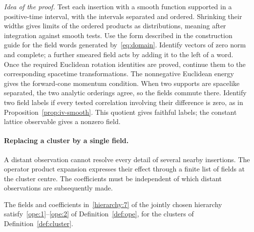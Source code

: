 \emph{Idea of the proof.}
Test each insertion with a smooth function supported in a positive-time interval, with the intervals separated and ordered. Shrinking their widths gives limits of the ordered products as distributions, meaning after integration against smooth tests.
Use the form described in the construction guide for the field words generated by~\eqref{eq:domain}. Identify vectors of zero norm and complete; a further smeared field acts by adding it to the left of a word.
Once the required Euclidean rotation identities are proved, continue them to the corresponding spacetime transformations. The nonnegative Euclidean energy gives the forward-cone momentum condition. When two supports are spacelike separated, the two analytic orderings agree, so the fields commute there.
Identify two field labels if every tested correlation involving their difference is zero, as in Proposition~\ref{prop:iv-smooth}. This quotient gives faithful labels; the constant lattice observable gives a nonzero field.


\paragraph{Replacing a cluster by a single field.}
A distant observation cannot resolve every detail of several nearby insertions.
The operator product expansion expresses their effect through a finite list of fields at the cluster centre.
The coefficients must be independent of which distant observations are subsequently made.

\begin{proposition}\label{prop:ope}
The fields and coefficients in~\ref{hierarchy:7} of the jointly chosen hierarchy satisfy~\ref{ope:1}--\ref{ope:2} of Definition~\ref{def:ope}, for the clusters of Definition~\ref{def:cluster}.
\end{proposition}

